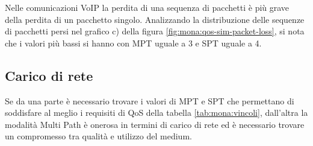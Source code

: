 \documentclass[12pt,a4paper,openright,twoside]{book}
\begin{document}
Nelle comunicazioni VoIP la perdita di una sequenza di pacchetti è più
grave della perdita di un pacchetto singolo. Analizzando la
distribuzione delle sequenze di pacchetti persi nel grafico c) della
figura \ref{fig:mona:qos-sim-packet-loss}, si nota che i valori più
bassi si hanno con MPT uguale a 3 e SPT uguale a 4.

\subsection{Carico di rete}

Se da una parte è necessario trovare i valori di MPT e SPT che
permettano di soddisfare al meglio i requisiti di QoS della tabella
\ref{tab:mona:vincoli}, dall'altra la modalità Multi Path è onerosa in
termini di carico di rete ed è necessario trovare un compromesso tra
qualità e utilizzo del medium.

\end{document}
